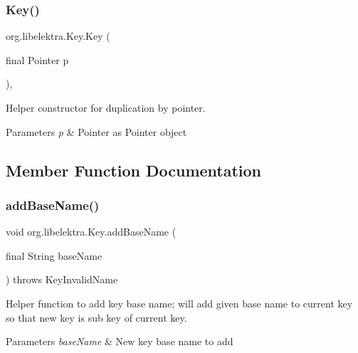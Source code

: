 \subsubsection{\texorpdfstring{Key()}{Key()}\hspace{0.1cm}{\footnotesize\ttfamily [2/2]}}
{\footnotesize\ttfamily org.\+libelektra.\+Key.\+Key (\begin{DoxyParamCaption}\item[{final Pointer}]{p }\end{DoxyParamCaption})\hspace{0.3cm}{\ttfamily [inline]}, {\ttfamily [protected]}}



Helper constructor for duplication by pointer. 


\begin{DoxyParams}{Parameters}
{\em p} & Pointer as Pointer object \\
\hline
\end{DoxyParams}


\subsection{Member Function Documentation}
\mbox{\label{classorg_1_1libelektra_1_1Key_a07a939d44265c7b017104f3f37e9ca16}} 
\subsubsection{\texorpdfstring{add\+Base\+Name()}{addBaseName()}}
{\footnotesize\ttfamily void org.\+libelektra.\+Key.\+add\+Base\+Name (\begin{DoxyParamCaption}\item[{final String}]{base\+Name }\end{DoxyParamCaption}) throws Key\+Invalid\+Name\hspace{0.3cm}{\ttfamily [inline]}}



Helper function to add key base name; will add given base name to current key so that new key is sub key of current key. 


\begin{DoxyParams}{Parameters}
{\em base\+Name} & New key base name to add \\
\hline
\end{DoxyParams}

